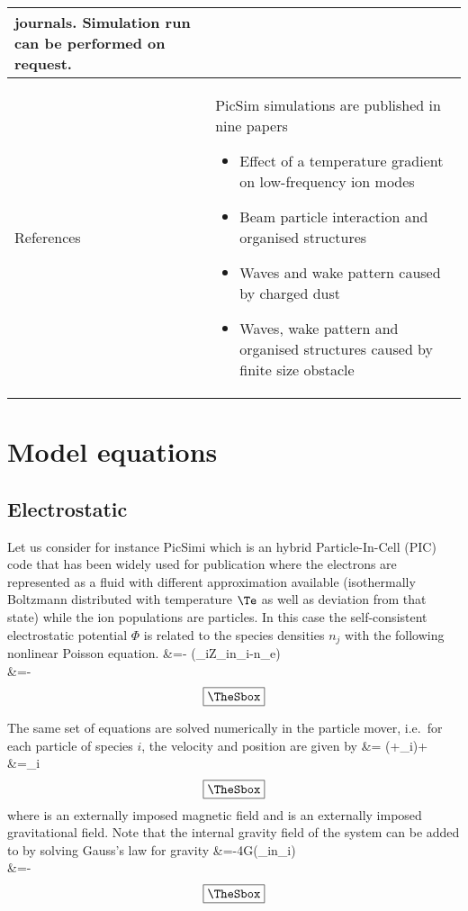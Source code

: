 \documentclass[10pt,a4paper]{article}
\newlength{\mylength}
\newenvironment{falign}%
{\setlength{\fboxsep}{15pt}
\setlength{\fboxrule}{0.5pt}
\setlength{\mylength}{\textwidth}
\addtolength{\mylength}{-2\fboxsep}
\addtolength{\mylength}{-2\fboxrule}
\Sbox
\minipage{\mylength}%
  \setlength{\abovedisplayskip}{-2\lineskip}
	\setlength{\belowdisplayskip}{-2\lineskip}
\align}%
{\endalign\endminipage\endSbox
\[\fbox{\TheSbox}\]}
\newcommand*{\picsim}{\textsf{PicSim}\xspace}
\newcommand{\PIC}{\renewcommand{\PIC}{PIC\xspace}Particle-In-Cell (PIC)\xspace}
\begin{document}
\begin{table}[ht]
\begin{footnotesize}
\begin{tabularx}{\textwidth}{|X|X|}
journals.
Simulation run can be performed on request. \\
\hline
References & \picsim simulations are published in nine papers
\begin{itemize}
\item Effect of a temperature gradient on low-frequency ion modes
\citep{guio:2001, guio:2010}
\item Beam particle interaction and organised structures
\citep{daldorff:2001,guio:2003a}
\item Waves and wake pattern caused by charged dust
\citep{guio:2003b,guio:2008a}
\item Waves, wake pattern and organised structures caused by finite size
obstacle \citep{guio:2004,guio:2005}
\end{itemize}\\
\hline
\end{tabularx}
\end{footnotesize}
\end{table}


\section{Model equations}

\subsection{Electrostatic}

Let us consider for instance \picsim{i} which is an hybrid \PIC code that has
been widely used for publication where the electrons are represented as a
fluid with different approximation available (isothermally Boltzmann
distributed with temperature $\Te$ as well as deviation from that state)
while the ion populations are particles. In this case the self-consistent
electrostatic potential $\Phi$ is related to the species densities $n_j$ with
the following nonlinear Poisson equation.
\begin{falign}
\lapl[r]\Phi&=-
\left(\sum_iZ_in_i-n_e\exp{}\right)\\
&=-\grad[r]{\Phi}
\end{falign}

The same set of equations are solved numerically in the particle mover,
i.e.\ for each particle of species $i$, the velocity
and position are given by
\begin{falign}
&=
\left(+_i\cross{}\right)+\\
&=_i
\end{falign}
where  is an externally imposed magnetic field and  is
an externally imposed gravitational field.
Note that the internal gravity field  of the system can
be added to  by solving Gauss's law for gravity
\begin{falign}
\lapl[r]\varphi&=-4\pi G\left(\sum_in_i\right)\\
&=-\grad[r]{\varphi}
\end{falign}
\end{document}
